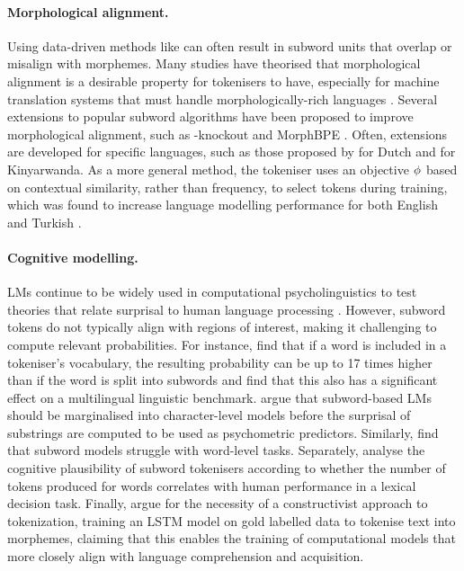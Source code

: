 \paragraph{Morphological alignment.} Using data-driven methods like \bpe can often result in subword units that overlap or misalign with morphemes. Many studies have theorised that morphological alignment is a desirable property for tokenisers to have, especially for machine translation systems that must handle morphologically-rich languages \citep{pan2020morphological}. Several extensions to popular subword algorithms have been proposed to improve morphological alignment, such as \bpe-knockout \citep{bauwens-delobelle-2024-bpe} and MorphBPE \citep{asgari2025morphbpe}. Often, extensions are developed for specific languages, such as those proposed by \citet{kildeberg2025sm} for Dutch and \citet{nzeyimana-niyongabo-rubungo-2022-kinyabert} for Kinyarwanda. As a more general method, the  tokeniser uses an objective $\phi$ based on contextual similarity, rather than frequency, to select tokens during training, which was found to increase language modelling performance for both English and Turkish \citep{yehezkel2023incorporating}. 

\paragraph{Cognitive modelling.} LMs continue to be widely used in computational psycholinguistics to test theories that relate surprisal to human language processing \citep{shain2024}. However, subword tokens do not typically align with regions of interest, making it challenging to compute relevant probabilities. For instance, \citet{lesci2025causal} find that if a word is included in a tokeniser's vocabulary, the resulting probability can be up to 17 times higher than if the word is split into subwords and \citet{jumelet2025multiblimp10massivelymultilingual} find that this also has a significant effect on a multilingual linguistic benchmark. \citet{giulianelli-etal-2024-proper} argue that subword-based LMs should be marginalised into character-level models before the surprisal of substrings are computed to be used as psychometric predictors. Similarly, \citet{bunzeck2025subwordmodelsstruggleword} find that subword models struggle with word-level tasks. Separately, \citet{beinborn-pinter-2023-analyzing} analyse the cognitive plausibility of subword tokenisers according to whether the number of tokens produced for words correlates with human performance in a lexical decision task. Finally, \citet{fan-sun-2023-constructivist} argue for the necessity of a constructivist approach to tokenization, training an LSTM model on gold labelled data to tokenise text into morphemes, claiming that this enables the training of computational models that more closely align with language comprehension and acquisition. 

